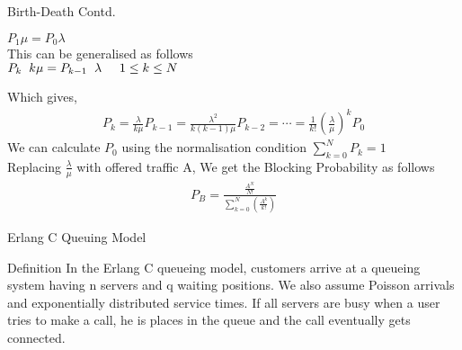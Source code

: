 \documentclass{beamer}
\providecommand{\brak}[1]{\ensuremath{\left(#1\right)}}
\begin{document}
\begin{frame}{Birth-Death Contd.}
  \begin{block}{}
    \begin{center}
      $P_1 \mu = P_0 \lambda$\\
      This can be generalised as follows\\
      $P_k \hspace{0.2cm} k\mu = P_{k-1} \hspace{0.2cm} \lambda \hspace{0.5cm} 1 \leq k \leq N$
    \end{center}
  \end{block}
  Which gives,
  \begin{align}
    P_k = \frac{\lambda}{k\mu} P_{k-1} = \frac{\lambda^2}{k(k-1)\mu} P_{k-2} = \cdots = \frac{1}{k!} \brak{\frac{\lambda}{\mu}}^{k} P_0
  \end{align}
  We can calculate $P_0$ using the normalisation condition $\sum_{k = 0}^{N} P_k = 1$\\
  Replacing $\frac{\lambda}{\mu}$ with offered traffic A, We get the Blocking Probability as follows
  \begin{align}
    P_B = \frac{\frac{A^{N}}{N!}}{\sum_{k = 0}^{N} \brak{\frac{A^k}{k!}}}
  \end{align}
\end{frame}
\begin{frame}{Erlang C Queuing Model}
  \begin{block}{Definition}
    In the Erlang C queueing model, customers arrive at a queueing system having n servers and q waiting positions.  We also assume Poisson arrivals and exponentially distributed service times.
    If all servers are busy when a user tries to make a call, he is places in the queue and the call eventually gets connected.
  \end{block}
\end{frame}
\end{document}
